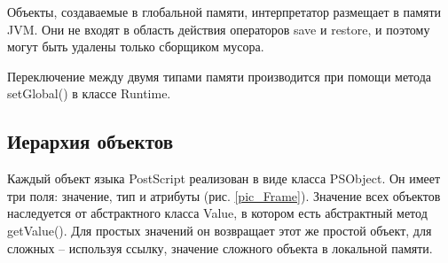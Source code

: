 \documentclass[14pt]{extarticle}
\begin{document}
Объекты, создаваемые в глобальной памяти, интерпретатор размещает в памяти JVM. Они не входят в область действия операторов save и restore, и поэтому могут быть удалены только сборщиком мусора.

Переключение между двумя типами памяти производится при помощи метода setGlobal() в классе Runtime.
\subsection{Иерархия объектов}
Каждый объект языка PostScript реализован в виде класса PSObject. Он имеет три поля: значение, тип и атрибуты (рис. \ref{pic_Frame}). Значение всех объектов наследуется от абстрактного класса Value, в котором есть абстрактный метод getValue(). Для простых значений он возвращает этот же простой объект, для сложных -- используя ссылку, значение сложного объекта в локальной памяти. 
\end{document}
